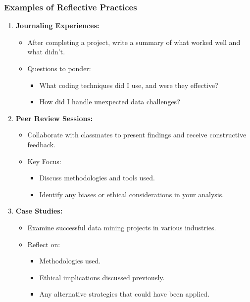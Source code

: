 \documentclass[aspectratio=169]{beamer}
\begin{document}
\begin{frame}[fragile]
    \frametitle{Examples of Reflective Practices}
    \begin{enumerate}
        \item \textbf{Journaling Experiences:}
        \begin{itemize}
            \item After completing a project, write a summary of what worked well and what didn’t.
            \item Questions to ponder:
            \begin{itemize}
                \item What coding techniques did I use, and were they effective?
                \item How did I handle unexpected data challenges?
            \end{itemize}
        \end{itemize}

        \item \textbf{Peer Review Sessions:}
        \begin{itemize}
            \item Collaborate with classmates to present findings and receive constructive feedback.
            \item Key Focus:
            \begin{itemize}
                \item Discuss methodologies and tools used.
                \item Identify any biases or ethical considerations in your analysis.
            \end{itemize}
        \end{itemize}

        \item \textbf{Case Studies:}
        \begin{itemize}
            \item Examine successful data mining projects in various industries.
            \item Reflect on:
            \begin{itemize}
                \item Methodologies used.
                \item Ethical implications discussed previously.
                \item Any alternative strategies that could have been applied.
            \end{itemize}
        \end{itemize}
    \end{enumerate}
\end{frame}
\end{document}

